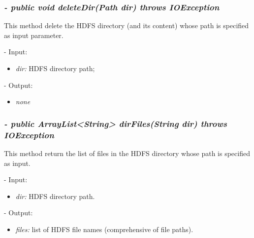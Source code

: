 \documentclass[]{report}
\begin{document}
	\subsubsection*{\textit{\textbf{-} public void deleteDir(Path dir) throws IOException}}   	
	This method delete the HDFS directory (and its content) whose path is specified as input parameter.
	\begin{description}
		\item - Input:
		\begin{itemize}
			\item \textit{dir:} HDFS directory path;
		\end{itemize}
	\end{description}
	\begin{description}
		\item - Output:
		\begin{itemize}
			\item \textit{none} 
		\end{itemize}
	\end{description}


	\subsubsection*{\textit{\textbf{-} public ArrayList<String> dirFiles(String dir) throws IOException}}   	
	This method return the list of files in the HDFS directory whose path is specified as input.
	\begin{description}
		\item - Input:
		\begin{itemize}
			\item \textit{dir:} HDFS directory path.
		\end{itemize}
	\end{description}
	\begin{description}
		\item - Output:
		\begin{itemize}
			\item \textit{files:} list of HDFS file names (comprehensive of file paths). 
		\end{itemize}
	\end{description}
\end{document}
